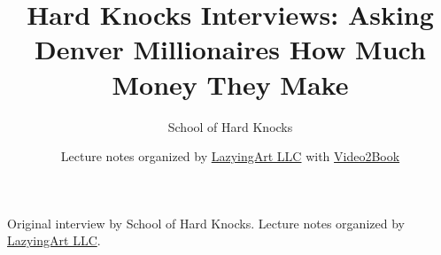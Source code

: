 \documentclass[11pt,oneside]{book}
\begin{document}
\frontmatter
\title{Hard Knocks Interviews: Asking Denver Millionaires How Much Money They Make}
\author{School of Hard Knocks}
\date{Lecture notes organized by \href{https://lazying.art}{LazyingArt LLC} with \href{https://github.com/lachlanchen/Video2Book}{Video2Book}}
\maketitle
\begin{center}
\small Original interview by School of Hard Knocks. Lecture notes organized by \href{https://lazying.art}{LazyingArt LLC}.
\end{center}
\clearpage
\mainmatter

\end{document}
